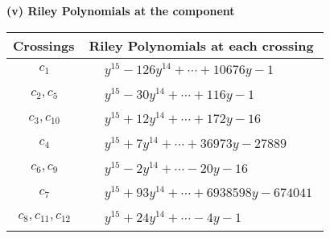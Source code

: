 \documentclass[1p]{elsarticle_modified}
\theoremstyle{definition}
\begin{document}
\flushleft \textbf{(v) Riley Polynomials at the component}\newline \\
\begin{tabular}{m{50pt}|m{274pt}}
Crossings & \hspace{64pt}Riley Polynomials at each crossing \\
\hline $$\begin{aligned}c_{1}\end{aligned}$$&$\begin{aligned}
&y^{15}-126 y^{14}+\cdots+10676 y-1
\end{aligned}$\\
\hline $$\begin{aligned}c_{2},c_{5}\end{aligned}$$&$\begin{aligned}
&y^{15}-30 y^{14}+\cdots+116 y-1
\end{aligned}$\\
\hline $$\begin{aligned}c_{3},c_{10}\end{aligned}$$&$\begin{aligned}
&y^{15}+12 y^{14}+\cdots+172 y-16
\end{aligned}$\\
\hline $$\begin{aligned}c_{4}\end{aligned}$$&$\begin{aligned}
&y^{15}+7 y^{14}+\cdots+36973 y-27889
\end{aligned}$\\
\hline $$\begin{aligned}c_{6},c_{9}\end{aligned}$$&$\begin{aligned}
&y^{15}-2 y^{14}+\cdots-20 y-16
\end{aligned}$\\
\hline $$\begin{aligned}c_{7}\end{aligned}$$&$\begin{aligned}
&y^{15}+93 y^{14}+\cdots+6938598 y-674041
\end{aligned}$\\
\hline $$\begin{aligned}c_{8},c_{11},c_{12}\end{aligned}$$&$\begin{aligned}
&y^{15}+24 y^{14}+\cdots-4 y-1
\end{aligned}$\\
\hline
\end{tabular}\\~\\
\end{document}
